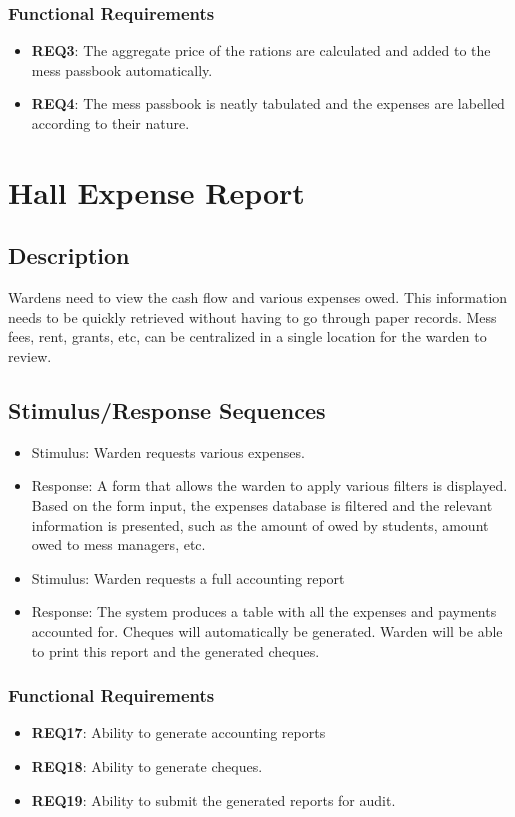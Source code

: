 \documentclass{scrreprt}
\begin{document}
\subsubsection{Functional Requirements}
\begin{itemize}
    \item \textbf{REQ3}: The aggregate price of the rations are calculated and added to the mess passbook automatically.
    \item \textbf{REQ4}: The mess passbook is neatly tabulated and the expenses are labelled according to their nature.
\end{itemize}

\section{Hall Expense Report}
\subsection{Description}
Wardens need to view the cash flow and various expenses owed. This information needs to be quickly retrieved without having to go through paper records. Mess fees, rent, grants, etc, can be centralized in a single location for the warden to review.
\subsection{Stimulus/Response Sequences}
\begin{itemize}
    \item Stimulus: Warden requests various expenses.
    \item Response: A form that allows the warden to apply various filters is displayed. Based on the form input, the expenses database is filtered and the relevant information is presented, such as the amount of owed by students, amount owed to mess managers, etc.
\end{itemize}

\begin{itemize}
    \item Stimulus: Warden requests a full accounting report
    \item Response: The system produces a table with all the expenses and payments accounted for. Cheques will automatically be generated. Warden will be able to print this report and the generated cheques.
\end{itemize}
\subsubsection{Functional Requirements}
\begin{itemize}
    \item \textbf{REQ17}: Ability to generate accounting reports
    \item \textbf{REQ18}: Ability to generate cheques.
    \item \textbf{REQ19}: Ability to submit the generated reports for audit.
\end{itemize}
\end{document}
